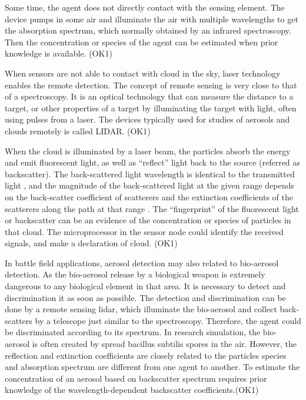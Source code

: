 Some time, the agent does not directly contact with the sensing element.
The device pumps in some air and illuminate the air with multiple
wavelengths to get the absorption spectrum, which normally obtained
by an infrared spectroscopy. Then the concentration or species of
the agent can be estimated when prior knowledge is available. (OK1)

When sensors are not able to contact with cloud in the sky, laser
technology enables the remote detection. The concept of remote sensing
is very close to that of a spectroscopy. It is an optical technology
that can measure the distance to a target, or other properties of
a target by illuminating the target with light, often using pulses
from a laser. The devices typically used for studies of aerosols and
clouds remotely is called LIDAR. (OK1)

When the cloud is illuminated by a laser beam, the particles absorb
the energy and emit fluorescent light, as well as ``reflect'' light
back to the source (referred as backscatter). The back-scattered light
wavelength is identical to the transmitted light \cite{Lidar.Wiki.2011},
and the magnitude of the back-scattered light at the given range depends
on the back-scatter coefficient of scatterers and the extinction coefficients
of the scatterers along the path at that range \cite{P.M.Hamilton1969}.
The ``fingerprint'' of the fluorescent light or backscatter can
be an evidence of the concentration or species of particles in that
cloud. The microprocessor in the sensor node could identify the received
signals, and make a declaration of cloud. (OK1)

In battle field applications, aerosol detection may also related to
bio-aerosol detection. As the bio-aerosol release by a biological
weapon is extremely dangerous to any biological element in that area.
It is necessary to detect and discrimination it as soon as possible.
The detection and discrimination can be done by a remote sensing lidar,
which illuminate the bio-aerosol  and collect back-scatters by a telescope
just similar to the spectroscopy. Therefore, the agent could be discriminated
according to its spectrum. In research simulation, the bio-aerosol
is often created by spread bacillus subtilis spores in the air. However,
the reflection and extinction coefficients are closely related to
the particles species and absorption spectrum are different from one
agent to another. To estimate the concentration of an aerosol based
on backscatter spectrum requires prior knowledge of the wavelength-dependent
backscatter coefficients.(OK1)

